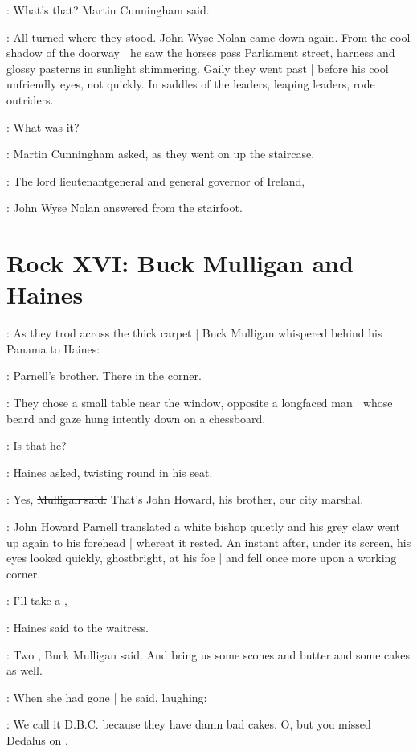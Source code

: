 \cunningham:
What's that?
\sout{Martin Cunningham said.}

:
All turned where they stood.
John Wyse Nolan came down again.
From the cool shadow of the doorway |
he saw the horses pass Parliament street,
harness and glossy pasterns in sunlight shimmering.
Gaily they went past |
before his cool unfriendly eyes,
not quickly.
In saddles of the leaders,
leaping leaders,
rode outriders.

\cunningham:
What was it?

:
Martin Cunningham asked,
as they went on up the staircase.

\johnwyse:
The lord lieutenantgeneral and general governor of Ireland,%

:
John Wyse Nolan answered from the stairfoot.


\section*{Rock XVI: Buck Mulligan and Haines}


:
As they trod across the thick carpet |
Buck Mulligan whispered behind his Panama to Haines:

\mulligan:
Parnell's brother.
There in the corner.

:
They chose a small table near the window,
opposite a longfaced man |
whose beard and gaze hung intently down on a chessboard.

\haines:
Is that he?

:
Haines asked,
twisting round in his seat.

\mulligan:
Yes,
\sout{Mulligan said.}
That's John Howard, his brother, our city marshal.

:
John Howard Parnell translated a white bishop quietly%
and his grey claw went up again to his forehead |
whereat it rested.
An instant after,
under its screen,
his eyes looked quickly, ghostbright, at his foe |
and fell once more upon a working corner.

\haines:
I'll take a ,

:
Haines said to the waitress.

\mulligan:
Two ,
\sout{Buck Mulligan said.}
And bring us some scones and butter
and some cakes as well.

:
When she had gone |
he said, laughing:

\mulligan:
We call it D.B.C. because they have damn bad cakes.
O, but you missed
Dedalus on .

